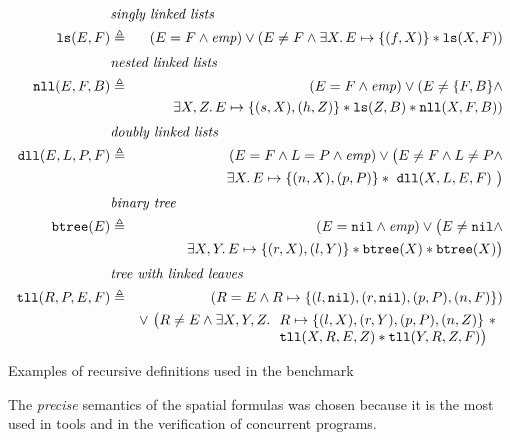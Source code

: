 \documentclass[twoside,11pt]{article}
\newcommand{\sep}{.\,}
\newcommand{\posep}{*}
\newcommand{\points}{\mapsto}
\newcommand{\nil}{\mathtt{nil}}
\newcommand{\ls}{\mathtt{ls}}
\newcommand{\dll}{\mathtt{dll}}
\newcommand{\nll}{\mathtt{nll}}
\begin{document}
\begin{table}
\begin{eqnarray}
%
\lefteqn{\textit{singly linked lists}} \nonumber \\
\ls(E,F) & \triangleq & (E=F\land\mathit{emp}) \lor (E\neq F \land 
\exists X\sep E\points\{(f,X)\}\posep \ls(X,F)) 
\\[1mm]
%  
\lefteqn{\textit{nested linked lists}} \nonumber \\ 
\nll(E,F,B) & \triangleq & (E=F\land\mathit{emp}) \lor (E\neq \{F,B\} \land \\
&& \exists X,Z\sep E\points\{(s,X),(h,Z)\}\posep \ls(Z,B) \posep\nll(X,F,B)) \nonumber
\\[1mm]
%  
\lefteqn{\textit{doubly linked lists}} \nonumber \\ 
\dll(E, L, P, F) & \triangleq & (E=F\land L=P\land \mathit{emp}) \lor \big( E\neq F \land L\neq P \land \\
&& \exists X\sep E\points \{(n,X),(p,P)\} \posep\ \dll(X,L,E,F)\ \big)\nonumber
\\[1mm]
%  
\lefteqn{\textit{binary tree}} \nonumber \\ 
\mathtt{btree}(E) & \triangleq & (E=\nil\land \mathit{emp}) \lor \big( E\neq \nil \land 
\\
&& \exists X,Y\sep E\points \{(r,X),(l,Y)\} \posep \mathtt{btree}(X) \posep \mathtt{btree}(X)\big)
\nonumber 
\\[1mm]
%  
\lefteqn{\textit{tree with linked leaves}} \nonumber \\ 
\mathtt{tll}(R,P,E,F) & \triangleq & (R=E \land R\points \{(l,\nil),(r,\nil),(p,P),(n,F)\}) \\
&& \lor~\big( R\neq E \land \exists X,Y,Z\sep 
\begin{array}[t]{l}
R\points \{(l,X),(r,Y),(p,P),(n,Z)\} \ \posep \\
\mathtt{tll}(X,R,E,Z) \posep \mathtt{tll}(Y,R,Z,F)\big)
\end{array} \nonumber  
\end{eqnarray}

\caption{Examples of recursive definitions used in the benchmark}
\label{tab:RD}

\end{table}

The \emph{precise} semantics of the spatial formulas was chosen because it is the most used in tools and in the verification of concurrent programs.
\end{document}
